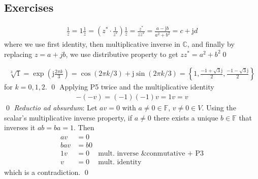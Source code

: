 \subsection*{Exercises}
\exo{}
\begin{align*}
\frac{1}{z} = 1 \frac{1}{z} = (z^* \cdot \frac{1}{z^*}) \frac{1}{z} = \frac{z^*}{zz^*}=\frac{a-\mathrm{j}b}{a^2 + b^2} = c+\mathrm{j}d
\end{align*}
where we use first identity, then multiplicative inverse in $\mathbb{C}$, and finally by replacing $z=a+jb$, we use distributive property 
to get $zz^* = a^2 + b^2 $\qed

\exo{}
\begin{align*}
\sqrt[3]{1} = \exp{\left(\mathrm{j}\frac{2\pi k}{3}\right)} = \cos(2\pi k/3) +\mathrm{j}\sin(2\pi k/3) = \left\{ 1, \frac{-1+\sqrt{3}\mathrm{j}}{2}, \frac{-1-\sqrt{3}\mathrm{j}}{2} \right\} 
\end{align*}
for $k=0,1,2$.  \qed
\exo{} Applying P5 twice and the multiplicative identity
\begin{align*}
-(-v)= (-1)(-1)v = 1v = v  
\end{align*}\qed
\exo{} \textit{Reductio ad absurdum}: Let $av=0$ with $a\neq 0 \in \mathbb{F}$, $v\neq0 \in V$. Using the scalar's multiplicative inverse property, if $a\neq 0$ there exists a unique $b\in \mathbb{F}$ that inverses it $ab = ba = 1$. Then
\begin{align*}
av &= 0 & \\ 
bav &= b0 & \\
1v &= 0 & \text{mult. inverse \& conmutative + P3}\\ 
v &=0 & \text{mult. identity}
\end{align*}
which is a contradiction. 
\qed
\exo{}
